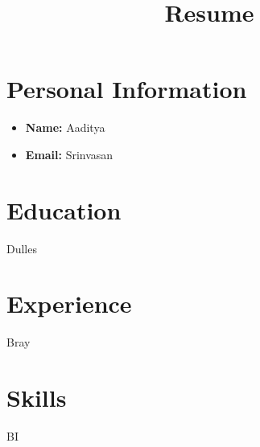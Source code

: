 \documentclass{article}
\title{Resume}
\author{}
\date{\vspace{-5ex}}
\begin{document}
\maketitle

\section*{Personal Information}
\begin{itemize}
    \item \textbf{Name:} Aaditya
    \item \textbf{Email:} Srinvasan
\end{itemize}

\section*{Education}
\begin{itemize}
Dulles
\end{itemize}

\section*{Experience}
\begin{itemize}
Bray
\end{itemize}

\section*{Skills}
\begin{itemize}
BI
\end{itemize}
\end{document}
